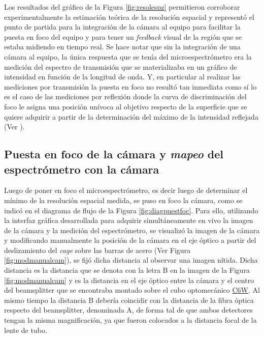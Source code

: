 Los resultados del gráfico de la Figura \ref{fig:resolespz} permitieron corroborar experimentalmente la estimación teórica de la resolución espacial y representó el punto de partida para la integración de la cámara al equipo para facilitar la puesta en foco del equipo y para tener un \textit{feedback} visual de la región que se estaba midiendo en tiempo real. Se hace notar que sin la integración de una cámara al equipo, la única respuesta que se tenía del microespectrómetro era la medición del espectro de transmisión que se materializaba en un gráfico de intensidad en función de la longitud de onda. Y, en particular al realizar las mediciones por transmisión la puesta en foco no resultó tan inmediata como sí lo es el caso de las mediciones por reflexión donde la curva de discriminación del foco le asigna una posición unívoca al objetivo respecto de la superficie que se quiere adquirir a partir de la determinación del máximo de la intensidad reflejada (Ver \cite{mour}). 

\singlespacing
\subsection{Puesta en foco de la cámara y \textit{mapeo} del espectrómetro con la cámara}
\label{sec:fococam}

\hspace{0.5cm}Luego de poner en foco el microespectrómetro, es decir luego de determinar el mínimo de la resolución espacial medida, se puso en foco la cámara, como se indicó en el diagrama de flujo de la Figura \ref{fig:diagpuestfoc}. Para ello, utilizando la interfaz gráfica desarrollada para adquirir simultáneamente en vivo la imagen de la cámara y la medición del espectrómetro, se visualizó la imagen de la cámara y modificando manualmente la posición de la cámara en el eje óptico a partir del deslizamiento del \textit{cage} sobre las barras de acero (Ver Figura \ref{fig:modmanualcam}), se fijó dicha distancia al observar una imagen nítida. Dicha distancia es la distancia que se denota con la letra B en la imagen de  la Figura \ref{fig:modmanualcam} y es la distancia en el eje óptico entre la cámara y el centro del beamsplitter que se encontraba montado sobre el cubo optomecánico \href{https://www.thorlabs.com/thorproduct.cfm?partnumber=C6W}{C6W}. Al mismo tiempo la distancia B debería coincidir con la distancia de la fibra óptica respecto del beamsplitter, denominada A, de forma tal de que ambos detectores tengan la misma magnificación, ya que fueron colocados a la distancia focal de la lente de tubo.  

